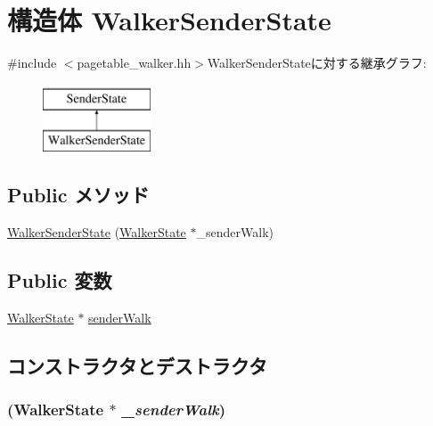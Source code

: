 \hypertarget{structX86ISA_1_1Walker_1_1WalkerSenderState}{
\section{構造体 WalkerSenderState}
\label{structX86ISA_1_1Walker_1_1WalkerSenderState}
}


{\ttfamily \#include $<$pagetable\_\-walker.hh$>$}WalkerSenderStateに対する継承グラフ:\begin{figure}[H]
\begin{center}
\leavevmode
\includegraphics[height=2cm]{structX86ISA_1_1Walker_1_1WalkerSenderState}
\end{center}
\end{figure}
\subsection*{Public メソッド}
\begin{DoxyCompactItemize}
\item 
\hyperlink{structX86ISA_1_1Walker_1_1WalkerSenderState_a17040bf5cbdee594f6c126a957689616}{WalkerSenderState} (\hyperlink{classX86ISA_1_1Walker_1_1WalkerState}{WalkerState} $\ast$\_\-senderWalk)
\end{DoxyCompactItemize}
\subsection*{Public 変数}
\begin{DoxyCompactItemize}
\item 
\hyperlink{classX86ISA_1_1Walker_1_1WalkerState}{WalkerState} $\ast$ \hyperlink{structX86ISA_1_1Walker_1_1WalkerSenderState_a36cdab45ce488c7978f72c6b8cc1d2ad}{senderWalk}
\end{DoxyCompactItemize}


\subsection{コンストラクタとデストラクタ}
\hypertarget{structX86ISA_1_1Walker_1_1WalkerSenderState_a17040bf5cbdee594f6c126a957689616}{
\subsubsection[{WalkerSenderState}]{ ({\bf WalkerState} $\ast$ {\em \_\-senderWalk})}}
\label{structX86ISA_1_1Walker_1_1WalkerSenderState_a17040bf5cbdee594f6c126a957689616}



